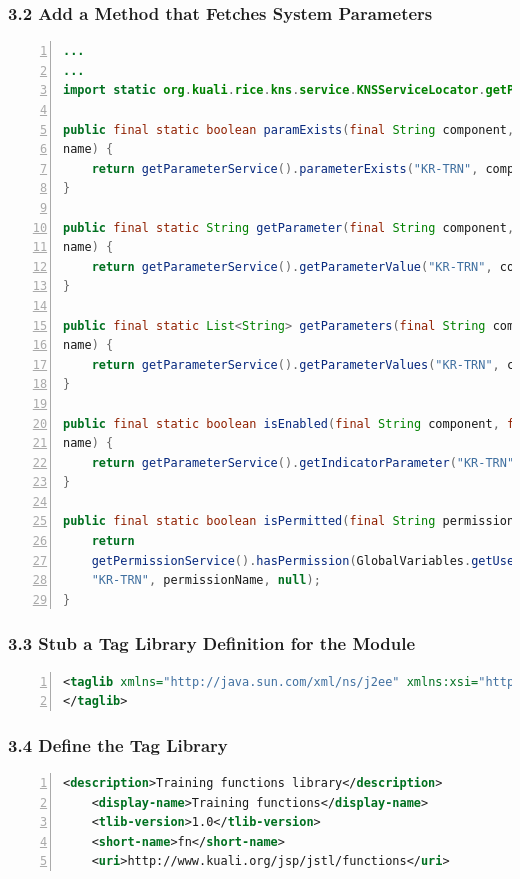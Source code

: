 \subsubsection*{3.2 Add a Method that Fetches System Parameters}
\begin{lstlisting}[basicstyle=\scriptsize,numbers=left,language=java,backgroundcolor=\color{ubergray},caption={training/web/TrainingFunctions},frame=single,breaklines=true]
...
...
import static org.kuali.rice.kns.service.KNSServiceLocator.getParameterService

public final static boolean paramExists(final String component, final String
name) {
    return getParameterService().parameterExists("KR-TRN", component, name);
}

public final static String getParameter(final String component, final String
name) {
    return getParameterService().getParameterValue("KR-TRN", component, name);
}

public final static List<String> getParameters(final String component, final String
name) {
    return getParameterService().getParameterValues("KR-TRN", component, name);
}

public final static boolean isEnabled(final String component, final String
name) {
    return getParameterService().getIndicatorParameter("KR-TRN", component, name);
}

public final static boolean isPermitted(final String permissionName) {
    return
    getPermissionService().hasPermission(GlobalVariables.getUserSession().getPrincipalId(),
    "KR-TRN", permissionName, null);
}
\end{lstlisting}

\subsubsection*{3.3 Stub a Tag Library Definition for the Module}
\begin{lstlisting}[basicstyle=\scriptsize,numbers=left,language=xml,backgroundcolor=\color{ubergray},caption={src/main/webapp/WEB-INF/tlds/trnfunc.tld
  Tag Library Definition},frame=single,breaklines=true]
<taglib xmlns="http://java.sun.com/xml/ns/j2ee" xmlns:xsi="http://www.w3.org/2001/XMLSchema-instance" xsi:schemaLocation="http://java.sun.com/xml/ns/j2ee http://java.sun.com/xml/ns/j2ee/web-jsptaglibrary_2_0.xsd" version="2.0">
</taglib>
\end{lstlisting}

\subsubsection*{3.4 Define the Tag Library}
\begin{lstlisting}[basicstyle=\scriptsize,numbers=left,language=xml,backgroundcolor=\color{ubergray},caption={src/main/webapp/WEB-INF/tlds/trnfunc.tld
  Tag Library Definition},frame=single,breaklines=true]
    <description>Training functions library</description>
    <display-name>Training functions</display-name>
    <tlib-version>1.0</tlib-version>
    <short-name>fn</short-name>
    <uri>http://www.kuali.org/jsp/jstl/functions</uri>
\end{lstlisting}

